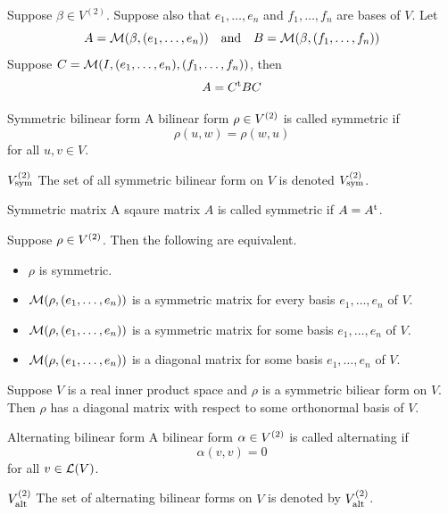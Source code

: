 \documentclass[12pt,a4paper]{article}
\begin{document}
    \begin{prop}
        Suppose $\beta\in V^{(2)}$. Suppose also that $e_1,\dots,e_n$ and $f_1,\dots,f_n$ are bases of $V$. Let
        $$
        A=\mathcal{M}(\beta,(e_1,\dots,e_n))\quad\text{and}\quad B=\mathcal{M}(\beta,(f_1,\dots,f_n))
        $$
        Suppose $C=\mathcal{M}(I,(e_1,\dots,e_n),(f_1,\dots,f_n))$, then
        $$
        A=C^\mathrm{t}BC
        $$
    \end{prop}
    \hfill

    \begin{defi}{Symmetric bilinear form}
        A bilinear form $\rho\in V^{(2)}$ is called symmetric if
        $$
        \rho(u,w)=\rho(w,u)
        $$
        for all $u,v\in V$.
    \end{defi}
    \begin{notation}{$V^{(2)}_{\mathrm{sym}}$}
        The set of all symmetric bilinear form on $V$ is denoted $V^{(2)}_{\mathrm{sym}}$.
    \end{notation}
    \hfill

    \begin{defi}{Symmetric matrix}
        A sqaure matrix $A$ is called symmetric if $A=A^\mathrm{t}$.
    \end{defi}
    \hfill

    \begin{prop}\label{9.10}
        Suppose $\rho\in V^{(2)}$. Then the following are equivalent.
        \begin{itemize}
            \item $\rho$ is symmetric.
            \item $\mathcal{M}(\rho,(e_1,\dots,e_n))$ is a symmetric matrix for every basis $e_1,\dots,e_n$ of $V$.
            \item $\mathcal{M}(\rho,(e_1,\dots,e_n))$ is a symmetric matrix for some basis $e_1,\dots,e_n$ of $V$.
            \item $\mathcal{M}(\rho,(e_1,\dots,e_n))$ is a diagonal matrix for some basis $e_1,\dots,e_n$ of $V$.
        \end{itemize}
    \end{prop}
    \hfill

    \begin{prop}\label{9.11}
        Suppose $V$ is a real inner product space and $\rho$ is a symmetric biliear form on $V$. Then $\rho$ has a diagonal matrix with respect to some orthonormal basis of $V$.
    \end{prop}
    \hfill

    \begin{defi}{Alternating bilinear form}
        A bilinear form $\alpha\in V^{(2)}$ is called alternating if
        $$
        \alpha(v,v)=0
        $$
        for all $v\in\mathcal{L}(V)$.
    \end{defi}
    \begin{notation}{$V^{(2)}_{\mathrm{alt}}$}
        The set of alternating bilinear forms on $V$ is denoted by $V^{(2)}_{\mathrm{alt}}$.
    \end{notation}
    \hfill
\end{document}
